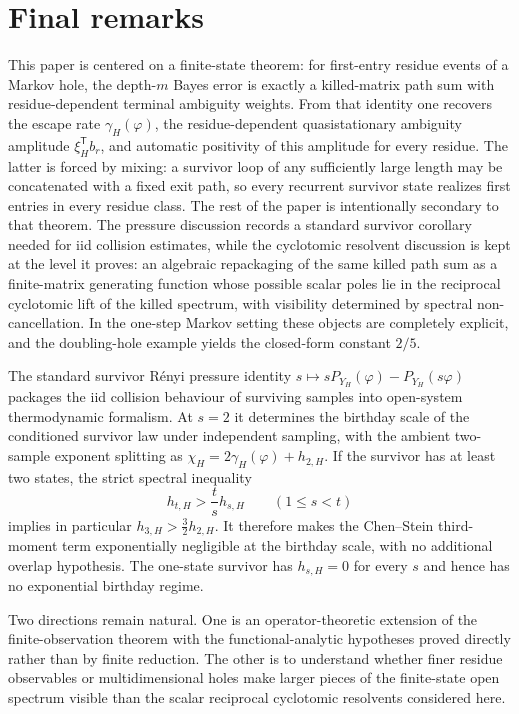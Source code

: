 \section{Final remarks}\label{sec:conclusion}

This paper is centered on a finite-state theorem: for first-entry
residue events of a Markov hole, the depth-\(m\) Bayes error is exactly
a killed-matrix path sum with residue-dependent terminal ambiguity
weights.  From that identity one recovers the escape rate
\(\gamma_H(\varphi)\), the residue-dependent quasistationary ambiguity
amplitude \(\xi_H^{\mathsf T}b_r\), and automatic positivity of this
amplitude for every residue.  The latter is forced by mixing: a survivor
loop of any sufficiently large length may be concatenated with a fixed
exit path, so every recurrent survivor state realizes first entries in
every residue class.  The rest of the paper is intentionally secondary
to that theorem.  The pressure discussion records a standard survivor
corollary needed for iid collision estimates, while the cyclotomic
resolvent discussion is kept at the level it proves: an algebraic
repackaging of the same killed path sum as a finite-matrix generating
function whose possible scalar poles lie in the reciprocal cyclotomic
lift of the killed spectrum, with visibility determined by spectral
non-cancellation.  In the one-step Markov setting these objects are
completely explicit, and the doubling-hole example yields the closed-form
constant \(2/5\).

The standard survivor R\'enyi pressure identity
\(s\mapsto sP_{Y_H}(\varphi)-P_{Y_H}(s\varphi)\) packages the
iid collision behaviour of surviving samples into open-system thermodynamic
formalism.  At \(s=2\) it determines the birthday scale of the
conditioned survivor law under independent sampling, with the ambient
two-sample exponent splitting
as \(\chi_H = 2\gamma_H(\varphi)+h_{2,H}\).  If the survivor has at
least two states, the strict spectral inequality
\[
  h_{t,H}>\frac{t}{s}h_{s,H}\qquad(1\leq s<t)
\]
implies in particular \(h_{3,H}>\frac32h_{2,H}\).  It therefore makes
the Chen--Stein third-moment term exponentially negligible at the
birthday scale, with no additional overlap hypothesis.  The one-state
survivor has \(h_{s,H}=0\) for every \(s\) and hence has no exponential
birthday regime.

Two directions remain natural.  One is an operator-theoretic extension
of the finite-observation theorem with the functional-analytic
hypotheses proved directly rather than by finite reduction.  The other
is to understand whether finer residue observables or multidimensional
holes make larger pieces of the finite-state open spectrum visible than
the scalar reciprocal cyclotomic resolvents considered here.
